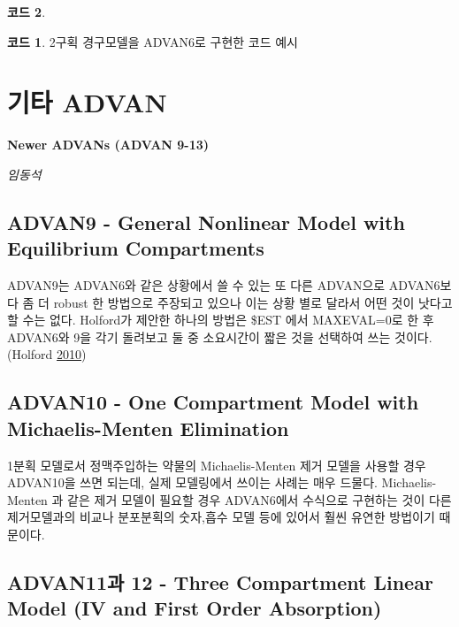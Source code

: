 \documentclass[
  10pt,
  krantz2,
  a4paper]{krantz}
\theoremstyle{definition}
\theoremstyle{definition}
\newtheorem{example}{코드}[chapter]
\theoremstyle{definition}
\theoremstyle{remark}
\begin{document}
\begin{example}
\begin{example}

\protect\hypertarget{exm:advan6-example}{}{\label{exm:advan6-example} }2구획 경구모델을 ADVAN6로 구현한 코드 예시

\end{example}
\end{example}

\hypertarget{newer-advan}{%
\chapter{기타 ADVAN}\label{newer-advan}}

\textbf{Newer ADVANs (ADVAN 9-13)}

\emph{임동석}

\hypertarget{advan9---general-nonlinear-model-with-equilibrium-compartments}{%
\section{ADVAN9 - General Nonlinear Model with Equilibrium Compartments}\label{advan9---general-nonlinear-model-with-equilibrium-compartments}}

ADVAN9는 ADVAN6와 같은 상황에서 쓸 수 있는 또 다른 ADVAN으로 ADVAN6보다 좀 더 robust 한 방법으로 주장되고 있으나 이는 상황 별로 달라서 어떤 것이 낫다고 할 수는 없다. Holford가 제안한 하나의 방법은 \$EST 에서 MAXEVAL=0로 한 후 ADVAN6와 9을 각기 돌려보고 둘 중 소요시간이 짧은 것을 선택하여 쓰는 것이다. (Holford \protect\hyperlink{ref-nickholford}{2010})

\hypertarget{advan10---one-compartment-model-with-michaelis-menten-elimination}{%
\section{ADVAN10 - One Compartment Model with Michaelis-Menten Elimination}\label{advan10---one-compartment-model-with-michaelis-menten-elimination}}

1분획 모델로서 정맥주입하는 약물의 Michaelis-Menten 제거 모델을 사용할 경우 ADVAN10을 쓰면 되는데, 실제 모델링에서 쓰이는 사례는 매우 드물다. Michaelis-Menten 과 같은 제거 모델이 필요할 경우 ADVAN6에서 수식으로 구현하는 것이 다른 제거모델과의 비교나 분포분획의 숫자,흡수 모델 등에 있어서 훨씬 유연한 방법이기 때문이다.

\hypertarget{advan11uxacfc-12---three-compartment-linear-model-iv-and-first-order-absorption}{%
\section{ADVAN11과 12 - Three Compartment Linear Model (IV and First Order Absorption)}\label{advan11uxacfc-12---three-compartment-linear-model-iv-and-first-order-absorption}}
\end{document}
